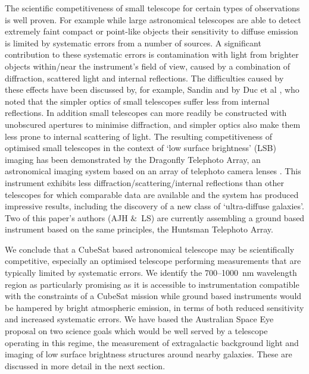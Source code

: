 \documentclass[]{iac}
\begin{document}
The scientific competitiveness of small telescope for certain types of observations is well proven. For example while
large astronomical telescopes are able to detect extremely faint compact or point-like objects their sensitivity to
diffuse emission is limited by systematic errors from a number of sources.  A significant contribution to these
systematic errors is contamination with light from brighter objects within/near the instrument's field of view, caused
by a combination of diffraction, scattered light and internal reflections. The difficulties caused by these effects have
been discussed by, for example, Sandin \cite{Sandin2014,Sandin2015} and by Duc et al \cite{Duc2014}, who noted that the
simpler optics of small telescopes suffer less from internal reflections. In addition small telescopes can more readily
be constructed with unobscured apertures to minimise diffraction, and simpler optics also make them less prone to
internal scattering of light. The resulting competitiveness of optimised small telescopes in the context of `low surface
brightness' (LSB) imaging has been demonstrated by the Dragonfly Telephoto Array, an astronomical imaging system based
on an array of telephoto camera lenses \cite{Abraham2014}.  This instrument exhibits less
diffraction/scattering/internal reflections than other telescopes for which comparable data are available
\cite{Abraham2014,Sandin2014} and the system has produced impressive results, including the discovery of a new class of
`ultra-diffuse galaxies'\cite{VanDokkum2015}.  Two of this paper's authors (AJH \&\ LS) are currently assembling a
ground based instrument based on the same principles, the Huntsman Telephoto Array\cite{Horton2016}.

We conclude that a CubeSat based astronomical telescope may be scientifically competitive, especially an optimised
telescope performing measurements that are typically limited by systematic errors. We identify the
700--\SI{1000}{\nano\metre} wavelength region as particularly promising as it is accessible to instrumentation
compatible with the constraints of a CubeSat mission while ground based instruments would be hampered by bright
atmospheric emission, in terms of both reduced sensitivity and increased systematic errors.  We have based the
Australian Space Eye proposal on two science goals which would be well served by a telescope operating in this regime,
the measurement of extragalactic background light and imaging of low surface brightness structures around nearby
galaxies.  These are discussed in more detail in the next section.
\end{document}
